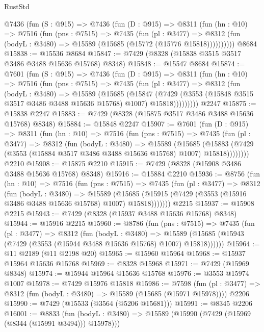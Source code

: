 \begin{lexlean}{RustStd}
\begin{coremodule}
    @7436
      (fun (S : @915) =>
      @7436
        (fun (D : @915) =>
        @8311
          (fun (hn : @10) =>
          @7516
            (fun (pns : @7515) =>
            @7435
              (fun (pl : @3477) =>
              @8312 (fun (bodyL : @3480) => @15589 (@15685 (@15772 (@15776 @15818))))))))))
    @8684
@15838 := @15536 @8684
@15847 := @7429 (@8328 (@15838 @3515 @3517 @3486 @3488 @15636 @15768) @8348)
@15848 := @15547 @8684
@15874 := @7601
    (fun (S : @915) =>
    @7436
      (fun (D : @915) =>
      @8311
        (fun (hn : @10) =>
        @7516
          (fun (pns : @7515) =>
          @7435
            (fun (pl : @3477) =>
            @8312
              (fun (bodyL : @3480) =>
              @15589
                (@15685
                  (@15847
                    (@7429
                      (@3553 (@15848 @3515 @3517 @3486 @3488 @15636 @15768) @1007)
                      @15818)))))))))
    @2247
@15875 := @15838 @2247
@15883 := @7429 (@8328 (@15875 @3517 @3486 @3488 @15636 @15768) @8348)
@15884 := @15848 @2247
@15907 := @7601
    (fun (D : @915) =>
    @8311
      (fun (hn : @10) =>
      @7516
        (fun (pns : @7515) =>
        @7435
          (fun (pl : @3477) =>
          @8312
            (fun (bodyL : @3480) =>
            @15589
              (@15685
                (@15883 (@7429 (@3553 (@15884 @3517 @3486 @3488 @15636 @15768) @1007) @15818))))))))
    @2210
@15908 := @15875 @2210
@15915 := @7429 (@8328 (@15908 @3486 @3488 @15636 @15768) @8348)
@15916 := @15884 @2210
@15936 := @8756
    (fun (hn : @10) =>
    @7516
      (fun (pns : @7515) =>
      @7435
        (fun (pl : @3477) =>
        @8312
          (fun (bodyL : @3480) =>
          @15589
            (@15685 (@15915 (@7429 (@3553 (@15916 @3486 @3488 @15636 @15768) @1007) @15818)))))))
    @2215
@15937 := @15908 @2215
@15943 := @7429 (@8328 (@15937 @3488 @15636 @15768) @8348)
@15944 := @15916 @2215
@15960 := @8786
    (fun (pns : @7515) =>
    @7435
      (fun (pl : @3477) =>
      @8312
        (fun (bodyL : @3480) =>
        @15589 (@15685 (@15943 (@7429 (@3553 (@15944 @3488 @15636 @15768) @1007) @15818))))))
@15964 := @11 @2189 (@11 @2198 @20)
@15965 := @15960 @15964
@15968 := @15937 @15964 @15636 @15768
@15969 := @8328 @15968
@15971 := @7429 (@15969 @8348)
@15974 := @15944 @15964 @15636 @15768
@15976 := @3553 @15974 @1007
@15978 := @7429 @15976 @15818
@15986 := @7598
    (fun (pl : @3477) => @8312 (fun (bodyL : @3480) => @15589 (@15685 (@15971 @15978))))
    @2206
@15990 := @7429 (@15533 (@3564 (@5206 @15681)))
@15991 := @8345 @2206
@16001 := @8833
    (fun (bodyL : @3480) => @15589 (@15990 (@7429 (@15969 (@8344 (@15991 @3494))) @15978)))

\end{coremodule}
\end{lexlean}
